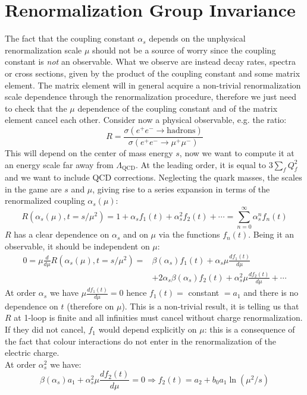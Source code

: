 \documentclass[../main.tex]{subfiles}
\begin{document}
\section{Renormalization Group Invariance}
The fact that the coupling constant $\alpha_s$ depends on the unphysical renormalization scale $\mu$ should not be a source of worry since the coupling constant is \textit{not} an observable. What we observe are instead decay rates, spectra or cross sections, given by the product of the coupling constant and some matrix element. The matrix element will in general acquire a non-trivial renormalization scale dependence through the renormalization procedure, therefore we just need to check that the $\mu$ dependence of the coupling constant and of the matrix element cancel each other.
Consider now a physical observable, e.g. the ratio: 
\[
R=\frac{\sigma(e^+e^-\to\text{hadrons})}{\sigma(e^+e^-\to\mu^+\mu^-)}
\]
This will depend on the center of mass energy $s$, now we want to compute it at an energy scale far away from $\Lambda_{\text{QCD}}$. At the leading order, it is equal to $3\sum_fQ_f^2$ and we want to include QCD corrections. Neglecting the quark masses, the scales in the game are $s$ and $\mu$, giving rise to a series expansion in terms of the renormalized coupling $\alpha_s(\mu)$:
\[
R(\alpha_s(\mu),t=s/\mu^2)=1+\alpha_sf_1(t)+\alpha_s^2f_2(t)+\cdots=\sum_{n=0}^\infty\alpha_s^nf_n(t)
\]
$R$ has a clear dependence on $\alpha_s$ and on $\mu$ via the functions $f_n(t)$. Being it an observable, it should be independent on $\mu$:
\begin{align*}
0=\mu\frac{d}{d\mu}R(\alpha_s(\mu),t=s/\mu^2)=&\beta(\alpha_s)f_1(t)+\alpha_s\mu\frac{df_1(t)}{d\mu}\\
&+2\alpha_s\beta(\alpha_s)f_2(t)+\alpha_s^2\mu\frac{df_2(t)}{d\mu}+\cdots
\end{align*}
At order $\alpha_s$ we have $\mu\frac{df_1(t)}{d\mu}=0$ hence $f_1(t)=$ constant $=a_1$ and there is no dependence on $t$ (therefore on $\mu$). This is a non-trivial result, it is telling us that $R$ at 1-loop is finite and all infinities must cancel without charge renormalization. If they did not cancel, $f_1$ would depend explicitly on $\mu$: this is a consequence of the fact that colour interactions do not enter in the renormalization of the electric charge.\\
At order $\alpha_s^2$ we have:
\[
\beta(\alpha_s)a_1+\alpha_s^2\mu\frac{df_2(t)}{d\mu}=0\Rightarrow f_2(t)=a_2+b_0a_1\ln(\mu^2/s)
\]
\end{document}
